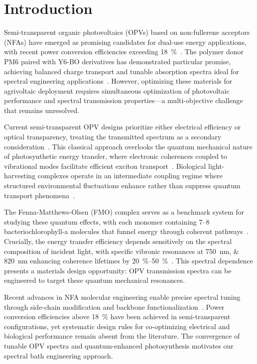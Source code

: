 
\section{Introduction}\label{sec:Introduction}

Semi-transparent organic photovoltaics (OPVs) based on non-fullerene acceptors (NFAs) have emerged as promising candidates for dual-use energy applications, with recent power conversion efficiencies exceeding \SI{18}{\percent}~\cite{Liu2024_AEM_NFA,Wang2023_AEM_Stability}. The polymer donor PM6 paired with Y6-BO derivatives has demonstrated particular promise, achieving balanced charge transport and tunable absorption spectra ideal for spectral engineering applications~\cite{Zhang2024_AEM_ML}. However, optimizing these materials for agrivoltaic deployment requires simultaneous optimization of photovoltaic performance and spectral transmission properties---a multi-objective challenge that remains unresolved.

Current semi-transparent OPV designs prioritize either electrical efficiency or optical transparency, treating the transmitted spectrum as a secondary consideration~\cite{Cui2021,Wu2024}. This classical approach overlooks the quantum mechanical nature of photosynthetic energy transfer, where electronic coherences coupled to vibrational modes facilitate efficient exciton transport~\cite{Engel2007,Panitchayangkoon2010}. Biological light-harvesting complexes operate in an intermediate coupling regime where structured environmental fluctuations enhance rather than suppress quantum transport phenomena~\cite{Ishizaki2009,Collini2010}.

The Fenna-Matthews-Olsen (FMO) complex serves as a benchmark system for studying these quantum effects, with each monomer containing \numrange{7}{8} bacteriochlorophyll-a molecules that funnel energy through coherent pathways~\cite{Fenna1974,Adolphs2006}. Crucially, the energy transfer efficiency depends sensitively on the spectral composition of incident light, with specific vibronic resonances at \SIlist{750;820}{\nano\meter} enhancing coherence lifetimes by \SIrange{20}{50}{\percent}~\cite{Mohseni2014,Hildner2013}. This spectral dependence presents a materials design opportunity: OPV transmission spectra can be engineered to target these quantum mechanical resonances.

Recent advances in NFA molecular engineering enable precise spectral tuning through side-chain modification and backbone functionalization~\cite{Li2020,Firdaus2019}. Power conversion efficiencies above \SI{18}{\percent} have been achieved in semi-transparent configurations, yet systematic design rules for co-optimizing electrical and biological performance remain absent from the literature. The convergence of tunable OPV spectra and quantum-enhanced photosynthesis motivates our spectral bath engineering approach.

